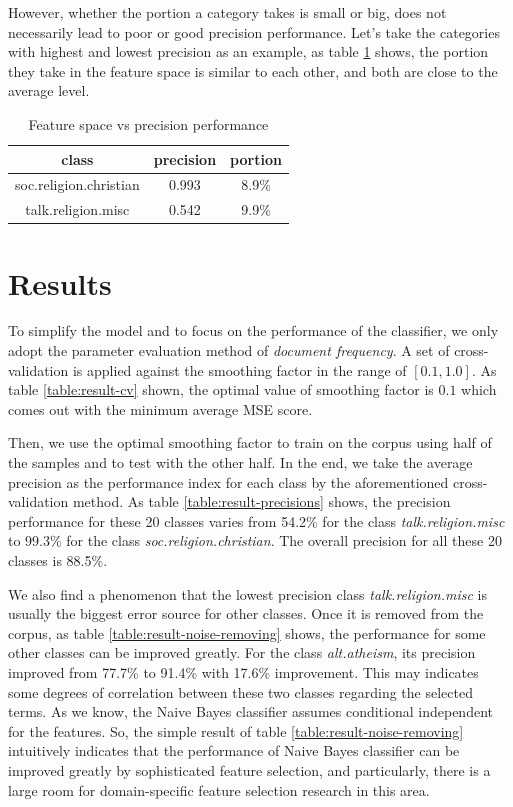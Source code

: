 \documentclass{article}
\begin{document}
However,  whether the portion a category takes is small or big, does not necessarily lead to poor or good precision performance. Let's take the categories with highest and lowest precision as an example, as table \ref{table:feature-perf} shows, the portion they take in the feature space is similar to each other, and both are close to the average level. 

\begin{table}[!ht]
	\centering
	\begin{tabular}{ |c|c|c| }
		\hline
		\textbf{class} & \textbf{precision} & \textbf{portion} \\
		\hline
		soc.religion.christian & 0.993 & 8.9\% \\
		\hline
		talk.religion.misc & 0.542 & 9.9\% \\
		\hline
		
	\end{tabular}
	\caption{Feature space vs precision performance}
	\label{table:feature-perf}
\end{table}

\section{Results}

To simplify the model and to focus on the performance of the classifier, we only adopt the parameter evaluation method of \textit{document frequency}. A set of cross-validation is applied against the smoothing factor in the range of $[0.1, 1.0]$. As table \ref{table:result-cv} shown, the optimal value of smoothing factor is $0.1$ which comes out with the minimum average MSE score.

Then, we use the optimal smoothing factor to train on the corpus using half of the samples and to test with the other half. In the end, we take the average precision as the performance index for each class by the aforementioned cross-validation method. As table \ref{table:result-precisions} shows, the precision performance for these 20 classes varies from 54.2\% for the class \textit{talk.religion.misc} to 99.3\% for the class \textit{soc.religion.christian}. The overall precision for all these 20 classes is 88.5\%.

We also find a phenomenon that the lowest precision class \textit{talk.religion.misc} is usually the biggest error source for other classes. Once it is removed from the corpus, as table \ref{table:result-noise-removing} shows, the performance for some other classes can be improved greatly. For the class \textit{alt.atheism}, its precision improved from 77.7\% to 91.4\% with 17.6\% improvement. This may indicates some degrees of correlation between these two classes regarding the selected terms. As we know, the Naive Bayes classifier assumes conditional independent for the features. So, the simple result of table \ref{table:result-noise-removing} intuitively indicates that the performance of Naive Bayes classifier can be improved greatly by sophisticated feature selection, and particularly, there is a large room for domain-specific feature selection research in this area.
\end{document}
